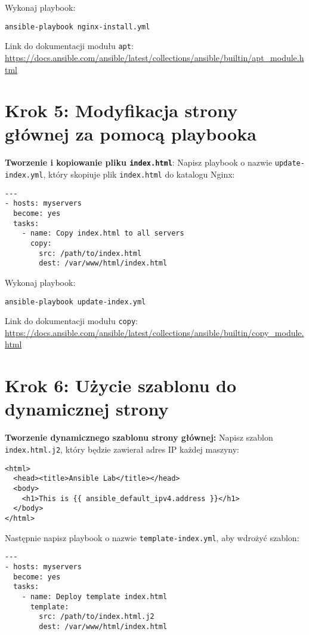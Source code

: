 \documentclass{article}
\begin{document}
Wykonaj playbook:

\begin{lstlisting}
ansible-playbook nginx-install.yml
\end{lstlisting}

Link do dokumentacji modułu \texttt{apt}:  
\url{https://docs.ansible.com/ansible/latest/collections/ansible/builtin/apt_module.html}

\section{Krok 5: Modyfikacja strony głównej za pomocą playbooka}

\textbf{Tworzenie i kopiowanie pliku \texttt{index.html}}:  
Napisz playbook o nazwie \texttt{update-index.yml}, który skopiuje plik \texttt{index.html} do katalogu Nginx:

\begin{lstlisting}
---
- hosts: myservers
  become: yes
  tasks:
    - name: Copy index.html to all servers
      copy:
        src: /path/to/index.html
        dest: /var/www/html/index.html
\end{lstlisting}

Wykonaj playbook:

\begin{lstlisting}
ansible-playbook update-index.yml
\end{lstlisting}

Link do dokumentacji modułu \texttt{copy}:  
\url{https://docs.ansible.com/ansible/latest/collections/ansible/builtin/copy_module.html}

\section{Krok 6: Użycie szablonu do dynamicznej strony}

\textbf{Tworzenie dynamicznego szablonu strony głównej:}  
Napisz szablon \texttt{index.html.j2}, który będzie zawierał adres IP każdej maszyny:

\begin{lstlisting}
<html>
  <head><title>Ansible Lab</title></head>
  <body>
    <h1>This is {{ ansible_default_ipv4.address }}</h1>
  </body>
</html>
\end{lstlisting}

Następnie napisz playbook o nazwie \texttt{template-index.yml}, aby wdrożyć szablon:

\begin{lstlisting}
---
- hosts: myservers
  become: yes
  tasks:
    - name: Deploy template index.html
      template:
        src: /path/to/index.html.j2
        dest: /var/www/html/index.html
\end{lstlisting}
\end{document}
